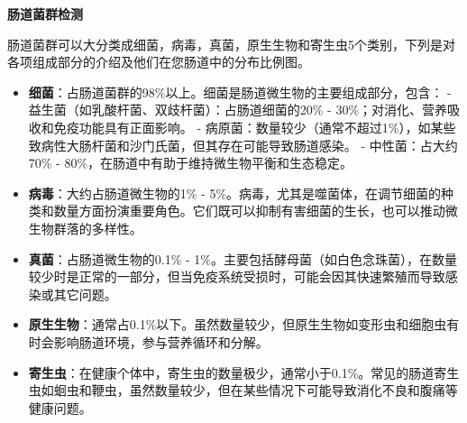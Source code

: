 \documentclass[UTF8]{ctexart}
\begin{document}
\newpage

\begin{tcolorbox}[
enhanced,
colback=white,
colframe=customTeal,
arc=2mm,
boxrule=1pt,
left=20pt,
right=20pt,
top=12pt,
bottom=12pt,
width=\textwidth,
fontupper=\sffamily,
overlay={
\draw[customTeal, line width=2pt]
([xshift=15pt]frame.south west) -- ([xshift=-15pt]frame.south east);
}
]
{\Large\bfseries\textcolor{customTeal}{\Huge 肠道菌群检测}}
\end{tcolorbox}

\begin{tcolorbox}[
    enhanced,
    colback=customTealBg,
    colframe=customTealBg,
    arc=3mm,
    boxrule=0pt,
    width=\textwidth,
    top=8pt,
    bottom=8pt
]
{\small{\color{customTeal}\faInfoCircle} 肠道菌群可以大分类成细菌，病毒，真菌，原生生物和寄生虫5个类别，下列是对各项组成部分的介绍及他们在您肠道中的分布比例图。
\begin{itemize}
    \item \textbf{细菌}：占肠道菌群的98\%以上。细菌是肠道微生物的主要组成部分，包含： - 益生菌（如乳酸杆菌、双歧杆菌）：占肠道细菌的20\% - 30\%；对消化、营养吸收和免疫功能具有正面影响。 - 病原菌：数量较少（通常不超过1\%），如某些致病性大肠杆菌和沙门氏菌，但其存在可能导致肠道感染。 - 中性菌：占大约70\% - 80\%，在肠道中有助于维持微生物平衡和生态稳定。
    \item \textbf{病毒}：大约占肠道微生物的1\% - 5\%。病毒，尤其是噬菌体，在调节细菌的种类和数量方面扮演重要角色。它们既可以抑制有害细菌的生长，也可以推动微生物群落的多样性。
    \item \textbf{真菌}：占肠道微生物的0.1\% - 1\%。主要包括酵母菌（如白色念珠菌），在数量较少时是正常的一部分，但当免疫系统受损时，可能会因其快速繁殖而导致感染或其它问题。
    \item \textbf{原生生物}：通常占0.1\%以下。虽然数量较少，但原生生物如变形虫和细胞虫有时会影响肠道环境，参与营养循环和分解。
    \item \textbf{寄生虫}：在健康个体中，寄生虫的数量极少，通常小于0.1\%。常见的肠道寄生虫如蛔虫和鞭虫，虽然数量较少，但在某些情况下可能导致消化不良和腹痛等健康问题。

\end{itemize}

}
\end{tcolorbox}
\end{document}
